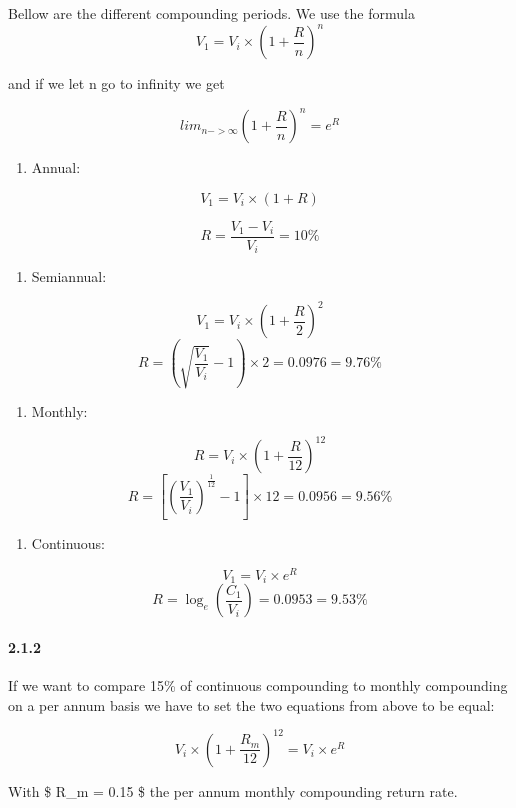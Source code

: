\documentclass[11pt]{article}
\providecommand{\tightlist}{%
      \setlength{\itemsep}{0pt}\setlength{\parskip}{0pt}}
\begin{document}
    Bellow are the different compounding periods. We use the formula
\[ V_1 = V_i \times (1+\frac{R}{n})^{n}\]

and if we let n go to infinity we get

\[ lim_{n->\infty} (1+\frac{R}{n})^{n} = e^{R} \]

    \begin{enumerate}
\def\labelenumi{\arabic{enumi}.}
\tightlist
\item
  Annual:
\end{enumerate}

\[ V_1= V_i \times (1+R) \]

\[ R={\frac {V_{1}-V_{i}}{V_{i}}} = 10\% \]

    \begin{enumerate}
\def\labelenumi{\arabic{enumi}.}
\setcounter{enumi}{1}
\tightlist
\item
  Semiannual:
\end{enumerate}

\[ V_1= V_i \times (1+\frac{R}{2})^2 \]
\[ R=(\sqrt{\frac{V_1}{V_i}}-1) \times 2 = 0.0976=9.76\%\]

    \begin{enumerate}
\def\labelenumi{\arabic{enumi}.}
\setcounter{enumi}{2}
\tightlist
\item
  Monthly:
\end{enumerate}

\[ R = V_i \times (1+\frac{R}{12})^{12}\]
\[ R =[(\frac{V_1}{V_i})^{\frac{1}{12}}-1] \times 12 = 0.0956 = 9.56 \%  \]

    \begin{enumerate}
\def\labelenumi{\arabic{enumi}.}
\setcounter{enumi}{3}
\tightlist
\item
  Continuous:
\end{enumerate}

    \[ V_1 = V_i \times e^{R} \]
\[ R = \log_{e}(\frac{C_1}{V_i})=0.0953=9.53\% \]

    \hypertarget{section}{%
\paragraph{2.1.2}\label{section}}

    If we want to compare 15\% of continuous compounding to monthly
compounding on a per annum basis we have to set the two equations from
above to be equal:

\[ V_i \times (1+\frac{R_m}{12})^{12} = V_i \times e^{R} \]

    With \$ R\_m = 0.15 \$ the per annum monthly compounding return rate.
\end{document}
